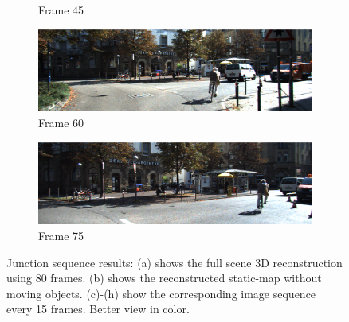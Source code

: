 \documentclass[10pt,twocolumn,letterpaper]{article}  %
\begin{document}
\begin{figure}[t]
\begin{subfigure}{0.165\textwidth}
  	\caption{Frame 45}
  	\label{fig:frame_45}
  	\end{subfigure}%
  	\begin{subfigure}{0.165\textwidth} 
 	\centering
  	\includegraphics[width=1\textwidth]{image/000060.eps}%
  	\caption{Frame 60}
  	\label{fig:frame_60}
  	\end{subfigure}%
  	\begin{subfigure}{0.165\textwidth} 
 	\centering
  	\includegraphics[width=1\textwidth]{image/000075.eps}%
  	\caption{Frame 75}
  	\label{fig:frame_75}
  	\end{subfigure}%
\caption{Junction sequence results: (a) shows the full scene 3D reconstruction using 80 frames. (b) shows the reconstructed static-map without moving objects. (c)-(h) show the corresponding image sequence every 15 frames. Better view in color.}
\label{fig:car_static_map_Reconst}
\vspace{-3mm}
\end{figure}
\end{document}
